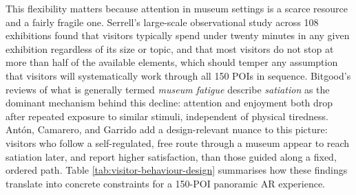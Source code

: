 This flexibility matters because attention in museum settings is a scarce
resource and a fairly fragile one. Serrell's large-scale observational
study across 108 exhibitions \cite{serrell1997} found that visitors
typically spend under twenty minutes in any given exhibition regardless of
its size or topic, and that most visitors do not stop at more than half of
the available elements, which should temper any assumption
that visitors will systematically work through all 150 POIs in sequence.
Bitgood's reviews of what is generally termed \emph{museum fatigue}
\cite{bitgood2009a, bitgood2009b} describe \emph{satiation} as the
dominant mechanism behind this decline: attention and enjoyment both drop
after repeated exposure to similar stimuli, independent of physical
tiredness. Antón, Camarero, and Garrido \cite{anton2018} add a design-relevant
nuance to this picture: visitors who follow a self-regulated, free route
through a museum appear to reach satiation later, and report higher
satisfaction, than those guided along a fixed, ordered path. Table
\ref{tab:visitor-behaviour-design} summarises how these findings translate
into concrete constraints for a 150-POI panoramic AR experience.

